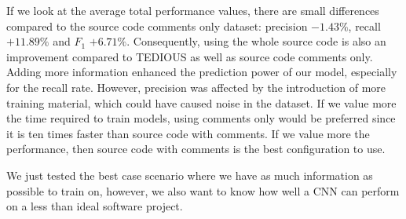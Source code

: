 \begin{table}[t]
	\caption{Within-project prediction: results of CNN for each system using source code without comments}
	\label{tab:withoutcomments}
	\centering\tiny
	\vspace{-3mm}
\end{table}

If we look at the average total performance values, there are small differences compared to the source code comments only dataset: precision $- 1.43\%$, recall $+ 11.89\%$ and $F_1$ $+ 6.71\%$. Consequently, using the whole source code is also an improvement compared to TEDIOUS as well as source code comments only. Adding more information enhanced the prediction power of our model, especially for the recall rate. However, precision was affected by the introduction of more training material, which could have caused noise in the dataset. If we value more the time required to train models, using comments only would be preferred since it is ten times faster than source code with comments. If we value more the performance, then source code with comments is the best configuration to use.

We just tested the best case scenario where we have as much information as possible to train on, however, we also want to know how well a CNN can perform on a less than ideal software project.

